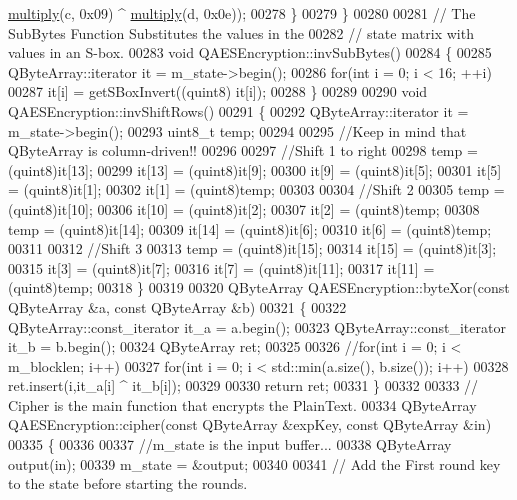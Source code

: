 \begin{DoxyCode}
      \hyperlink{qaesencryption_8cpp_adcc23c7a5520793f14710fff6ef23dfe}{multiply}(c, 0x09) ^ \hyperlink{qaesencryption_8cpp_adcc23c7a5520793f14710fff6ef23dfe}{multiply}(d, 0x0e));
00278   \}
00279 \}
00280 
00281 \textcolor{comment}{// The SubBytes Function Substitutes the values in the}
00282 \textcolor{comment}{// state matrix with values in an S-box.}
00283 \textcolor{keywordtype}{void} QAESEncryption::invSubBytes()
00284 \{
00285     QByteArray::iterator it = m\_state->begin();
00286     \textcolor{keywordflow}{for}(\textcolor{keywordtype}{int} i = 0; i < 16; ++i)
00287         it[i] = getSBoxInvert((quint8) it[i]);
00288 \}
00289 
00290 \textcolor{keywordtype}{void} QAESEncryption::invShiftRows()
00291 \{
00292     QByteArray::iterator it = m\_state->begin();
00293     uint8\_t temp;
00294 
00295     \textcolor{comment}{//Keep in mind that QByteArray is column-driven!!}
00296 
00297     \textcolor{comment}{//Shift 1 to right}
00298     temp   = (quint8)it[13];
00299     it[13] = (quint8)it[9];
00300     it[9]  = (quint8)it[5];
00301     it[5]  = (quint8)it[1];
00302     it[1]  = (quint8)temp;
00303 
00304     \textcolor{comment}{//Shift 2}
00305     temp   = (quint8)it[10];
00306     it[10] = (quint8)it[2];
00307     it[2]  = (quint8)temp;
00308     temp   = (quint8)it[14];
00309     it[14] = (quint8)it[6];
00310     it[6]  = (quint8)temp;
00311 
00312     \textcolor{comment}{//Shift 3}
00313     temp   = (quint8)it[15];
00314     it[15] = (quint8)it[3];
00315     it[3]  = (quint8)it[7];
00316     it[7]  = (quint8)it[11];
00317     it[11] = (quint8)temp;
00318 \}
00319 
00320 QByteArray QAESEncryption::byteXor(\textcolor{keyword}{const} QByteArray &a, \textcolor{keyword}{const} QByteArray &b)
00321 \{
00322   QByteArray::const\_iterator it\_a = a.begin();
00323   QByteArray::const\_iterator it\_b = b.begin();
00324   QByteArray ret;
00325 
00326   \textcolor{comment}{//for(int i = 0; i < m\_blocklen; i++)}
00327   \textcolor{keywordflow}{for}(\textcolor{keywordtype}{int} i = 0; i < std::min(a.size(), b.size()); i++)
00328       ret.insert(i,it\_a[i] ^ it\_b[i]);
00329 
00330   \textcolor{keywordflow}{return} ret;
00331 \}
00332 
00333 \textcolor{comment}{// Cipher is the main function that encrypts the PlainText.}
00334 QByteArray QAESEncryption::cipher(\textcolor{keyword}{const} QByteArray &expKey, \textcolor{keyword}{const} QByteArray &in)
00335 \{
00336 
00337   \textcolor{comment}{//m\_state is the input buffer...}
00338   QByteArray output(in);
00339   m\_state = &output;
00340 
00341   \textcolor{comment}{// Add the First round key to the state before starting the rounds.}

\end{DoxyCode}
